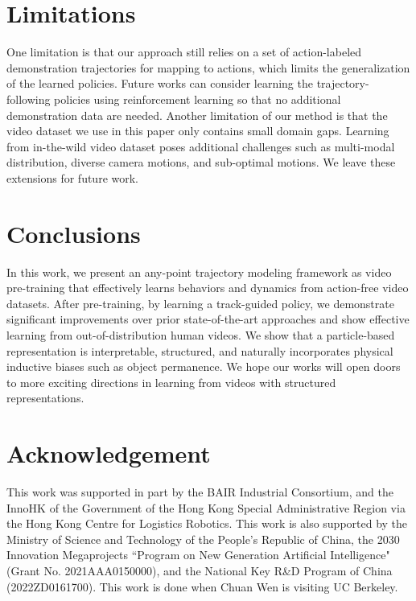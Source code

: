 \section{Limitations}
One limitation is that our approach still relies on a set of action-labeled demonstration trajectories for mapping to actions, which limits the generalization of the learned policies. Future works can consider learning the trajectory-following policies using reinforcement learning so that no additional demonstration data are needed. Another limitation of our method is that the video dataset we use in this paper only contains small domain gaps. Learning from in-the-wild video dataset poses additional challenges such as multi-modal distribution, diverse camera motions, and sub-optimal motions. We leave these extensions for future work. 


\section{Conclusions}
In this work, we present an any-point trajectory modeling framework as video pre-training that effectively learns behaviors and dynamics from action-free video datasets. After pre-training, by learning a track-guided policy, we demonstrate significant improvements over prior state-of-the-art approaches and show effective learning from out-of-distribution human videos.  We show that a particle-based representation is interpretable, structured, and naturally incorporates physical inductive biases such as object permanence. We hope our works will open doors to more exciting directions in learning from videos with structured representations.


\section{Acknowledgement}
This work was supported in part by the BAIR Industrial Consortium, and the InnoHK of the Government of the Hong Kong Special Administrative Region via the Hong Kong Centre for Logistics Robotics.
This work is also supported by the Ministry of Science and Technology of the People's Republic of China, the 2030 Innovation Megaprojects ``Program on New Generation Artificial Intelligence" (Grant No. 2021AAA0150000), and the National Key R\&D Program of China (2022ZD0161700). This work is done when Chuan Wen is visiting UC Berkeley.

